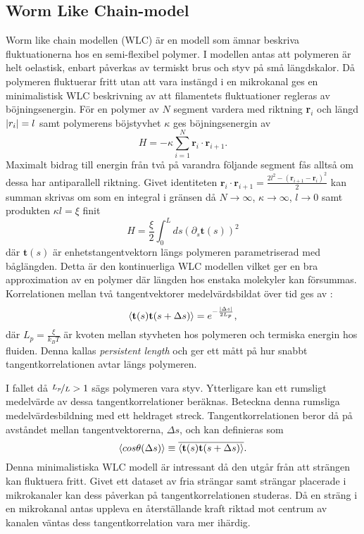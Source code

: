 \subsection{Worm Like Chain-model}
Worm like chain modellen \cite{Milstein2013} (WLC) är en modell som ämnar beskriva fluktuationerna hos en semi-flexibel polymer. I modellen antas att polymeren är helt oelastisk, enbart påverkas av termiskt brus och styv på små längdskalor. Då polymeren fluktuerar fritt utan att vara instängd i en mikrokanal ges en minimalistisk WLC beskrivning av att filamentets fluktuationer regleras av böjningsenergin. För en polymer av $N$ segment vardera med riktning \textbf{r}$_i$ och längd $\abs{r_{i}}=l$ samt polymerens böjstyvhet $\kappa$ ges böjningsenergin av 
\begin{equation}
    H = -\kappa\sum_{i=1}^{N}\textbf{r}_{i}\cdot \textbf{r}_{i+1}.
\end{equation}
Maximalt bidrag till energin från två på varandra följande segment fås alltså om dessa har antiparallell riktning. Givet identiteten $\textbf{r}_{i}\cdot\textbf{r}_{i+1}=\frac{2l^2-(\textbf{r}_{i+1}-\textbf{r}_{i})^2}{2}$ kan summan skrivas om som en integral i gränsen då $N \rightarrow \infty$, $\kappa\to\infty$, $l \rightarrow 0$ samt produkten $\kappa l=\xi$ finit 
\begin{equation}\label{böj}
    H=\frac{\xi}{2}\int_{0}^{L}ds(\partial_{s}\textbf{t}(s))^2
\end{equation}
där $\textbf{t}(s)$ är enhetstangentvektorn längs polymeren parametriserad med båglängden. Detta är den kontinuerliga WLC modellen \cite{Fixman_WLC1973} vilket ger en bra approximation av en polymer där längden hos enstaka molekyler kan försummas.  Korrelationen mellan två tangentvektorer medelvärdsbildat över tid ges av \cite{Landau1958}:
\begin{equation}
\ev{\textbf{t}(s)\textbf{t}(s+\Delta s)}=e^{-\frac{\abs{\Delta s}}{2L_{p}}},
\end{equation}
där $L_{p}=\frac{\xi}{k_{B}T}$ är kvoten mellan styvheten hos polymeren och termiska energin hos fluiden. Denna kallas \emph{persistent length} och ger ett mått på hur snabbt tangentkorrelationen avtar längs polymeren. 

I fallet då $\nicefrac{L_{p}}{L}>1$ sägs polymeren vara styv. Ytterligare kan ett rumsligt medelvärde av dessa tangentkorrelationer beräknas. Beteckna denna rumsliga medelvärdesbildning med ett heldraget streck. Tangentkorrelationen beror då på avståndet mellan tangentvektorerna, $\Delta s$, och kan definieras som
\begin{equation}
\label{tangkorr}
    \ev{cos\theta(\Delta s)}\equiv\overline{\ev{\mathbf{t}(s)\mathbf{t}(s+\Delta s)}}.
\end{equation}
Denna minimalistiska WLC modell är intressant då den utgår från att strängen kan fluktuera fritt. Givet ett dataset av fria strängar samt strängar placerade i mikrokanaler kan dess påverkan på tangentkorrelationen studeras. Då en sträng i en mikrokanal antas uppleva en återställande kraft riktad mot centrum av kanalen väntas dess tangentkorrelation vara mer ihärdig.


